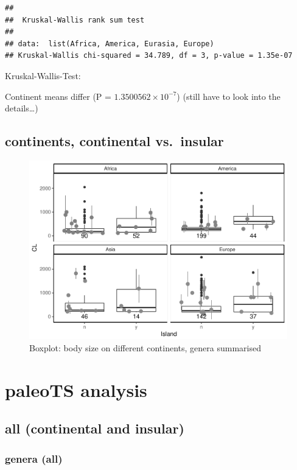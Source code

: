 \documentclass[]{article}
\begin{document}
\begin{verbatim}
## 
##  Kruskal-Wallis rank sum test
## 
## data:  list(Africa, America, Eurasia, Europe)
## Kruskal-Wallis chi-squared = 34.789, df = 3, p-value = 1.35e-07
\end{verbatim}

Kruskal-Wallis-Test:

Continent means differ (P = \(1.3500562\times 10^{-7}\)) (still have to
look into the details\ldots{})

\newpage

\subsection{continents, continental
vs.~insular}\label{continents-continental-vs.insular}

\begin{figure}[htbp]
\centering
\includegraphics{MA_JJ_files/figure-latex/BPConCI-1.pdf}
\caption{Boxplot: body size on different continents, genera summarised}
\end{figure}

\newpage

\section{paleoTS analysis}\label{paleots-analysis}

\subsection{all (continental and
insular)}\label{all-continental-and-insular}

\subsubsection{genera (all)}\label{genera-all}
\end{document}
